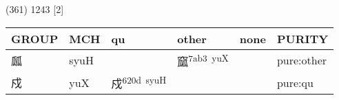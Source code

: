\documentclass[14pt,a4paper]{scrartcl}
\begin{document}
(361) 1243 {[}2{]}

\begin{longtable}[c]{@{}llllll@{}}
\toprule
\begin{minipage}[b]{0.14\columnwidth}\raggedright\strut
GROUP
\strut\end{minipage} &
\begin{minipage}[b]{0.14\columnwidth}\raggedright\strut
MCH
\strut\end{minipage} &
\begin{minipage}[b]{0.14\columnwidth}\raggedright\strut
qu
\strut\end{minipage} &
\begin{minipage}[b]{0.14\columnwidth}\raggedright\strut
other
\strut\end{minipage} &
\begin{minipage}[b]{0.14\columnwidth}\raggedright\strut
none
\strut\end{minipage} &
\begin{minipage}[b]{0.14\columnwidth}\raggedright\strut
PURITY
\strut\end{minipage}\tabularnewline
\midrule
\endhead
\begin{minipage}[t]{0.14\columnwidth}\raggedright\strut
㼌
\strut\end{minipage} &
\begin{minipage}[t]{0.14\columnwidth}\raggedright\strut
syuH
\strut\end{minipage} &
\begin{minipage}[t]{0.14\columnwidth}\raggedright\strut
\strut\end{minipage} &
\begin{minipage}[t]{0.14\columnwidth}\raggedright\strut
窳\textsuperscript{7ab3~yuX}
\strut\end{minipage} &
\begin{minipage}[t]{0.14\columnwidth}\raggedright\strut
\strut\end{minipage} &
\begin{minipage}[t]{0.14\columnwidth}\raggedright\strut
pure:other
\strut\end{minipage}\tabularnewline
\begin{minipage}[t]{0.14\columnwidth}\raggedright\strut
戍
\strut\end{minipage} &
\begin{minipage}[t]{0.14\columnwidth}\raggedright\strut
yuX
\strut\end{minipage} &
\begin{minipage}[t]{0.14\columnwidth}\raggedright\strut
戍\textsuperscript{620d~syuH}
\strut\end{minipage} &
\begin{minipage}[t]{0.14\columnwidth}\raggedright\strut
\strut\end{minipage} &
\begin{minipage}[t]{0.14\columnwidth}\raggedright\strut
\strut\end{minipage} &
\begin{minipage}[t]{0.14\columnwidth}\raggedright\strut
pure:qu
\strut\end{minipage}\tabularnewline
\bottomrule
\end{longtable}
\end{document}
